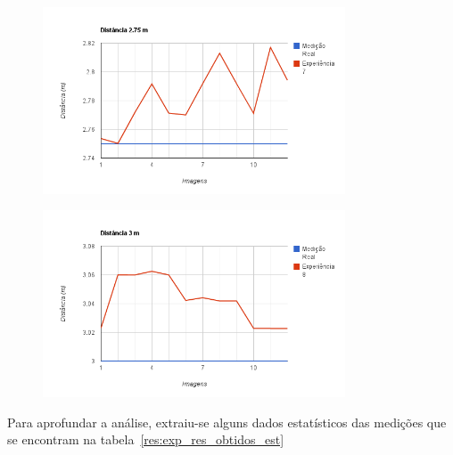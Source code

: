 \begin{figure}
\begin{center}
	\includegraphics[width=0.80\textwidth]{figures/experiencia/chart_7.png}
	\label{fig:chart_7}
\end{center}
\end{figure}

\begin{figure}
\begin{center}
	\includegraphics[width=0.80\textwidth]{figures/experiencia/chart_8.png}
	\label{fig:chart_8}
\end{center}
\end{figure}

Para aprofundar a análise, extraiu-se alguns dados estatísticos das medições que se encontram na tabela~\ref{res:exp_res_obtidos_est} 


